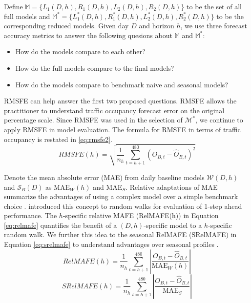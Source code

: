 Define $\mathbb{M}=\{L_1(D,h), R_1(D,h), L_2(D,h), R_2(D,h)\}$ to be the set of all full models and $\mathbb{M}^*=\{L^*_1(D,h), R^*_1(D,h), L^*_2(D,h), R^*_2(D,h)\}$ to be the corresponding reduced models. Given day $D$ and horizon $h$, we use three forecast accuracy metrics to answer the following quesions about $\mathbb{M}$ and $\mathbb{M}^*$:    
\begin{itemize}
   \item How do the models compare to each other?
   \item How do the full models compare to the final models?
   \item How do the models compare to benchmark naive and seasonal models?
 \end{itemize}

RMSFE can help answer the first two proposed questions. RMSFE allows the practitioner to understand traffic occupancy forecast error on the original percentage scale. Since RMSFE was used in the selection of $\mathcal{M}^*$,  we continue to apply RMSFE in model evaluation. The formula for RMSFE in terms of traffic occupancy is restated in \ref{eq:rmsfe2}.
\begin{equation}
 	\label{eq:rmsfe2}
  RMSFE(h)=\sqrt{\frac{1}{n_h}\sum\limits_{t=h+1}^{480} (O_{B,t}-\widehat{O}_{B,t})^2}
\end{equation}

Denote the mean absolute error (MAE) from daily baseline models $\mathcal{W}(D,h)$ and $\mathcal{S}_B(D)$ as $\textrm{MAE}_{W}(h)$ and $\textrm{MAE}_{S}$. Relative adaptations of MAE summarize the advantages of using a complex model over a simple benchmark choice \citep{Hyndman2006}. \cite{Theil1966} introduced this concept to random walks for evaluation of 1-step ahead performance. The $h$-specific relative MAFE (RelMAFE(h)) in Equation \ref{eq:relmafe} quantifies the benefit of a $(D,h)$-specific model to a $h$-specific random walk. We further this idea to the seasonal RelMAFE (SRelMAFE) in Equation \ref{eq:srelmafe} to understand advantages over seasonal profiles \citep{Makridakis2008}.
\begin{equation}
\label{eq:relmafe}
  RelMAFE(h)=\frac{1}{n_h}\sum\limits_{t=h+1}^{480}\left|\frac{O_{B,t}-\widehat{O}_{B,t}}{\textrm{MAE}_{W}(h)}\right|
\end{equation}
\begin{equation}
\label{eq:srelmafe}
  SRelMAFE(h)=\frac{1}{n_h}\sum\limits_{t=h+1}^{480}\left|\frac{O_{B,t}-\widehat{O}_{B,t}}{\textrm{MAE}_{S}}\right|
\end{equation}




